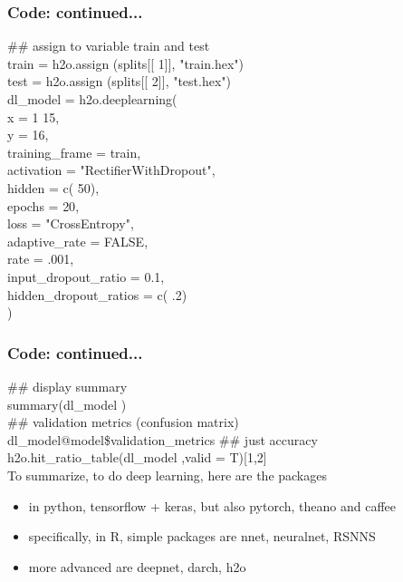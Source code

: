 \documentclass{beamer}
\begin{document}
\begin{frame}
\frametitle{Code: continued...}
{\color{applegreen}  \#\# assign to variable train and test } \\
train = h2o.assign (splits[[ {\color{blue} 1}]], {\color{red}"train.hex"}) \\
test  = h2o.assign (splits[[{\color{blue}  2}]], {\color{red}"test.hex"})     \\
dl\_model = h2o.deeplearning(  \\
\hspace{0.5cm}    x = {\color{blue} 1} {\color{blue} 15},  \\
\hspace{0.5cm}    y = {\color{blue} 16},  \\
\hspace{0.5cm}    training\_frame = train,  \\
\hspace{0.5cm}    activation = {\color{red}"RectifierWithDropout"}, \\
\hspace{0.5cm}    hidden = c({\color{blue} 50}), \\
\hspace{0.5cm}    epochs = {\color{blue} 20}, \\
\hspace{0.5cm}    loss = {\color{red}"CrossEntropy"}, \\
\hspace{0.5cm}    adaptive\_rate = FALSE, \\
\hspace{0.5cm}    rate ={\color{blue} .001}, \\
\hspace{0.5cm}    input\_dropout\_ratio = {\color{blue} 0.1}, \\
\hspace{0.5cm}    hidden\_dropout\_ratios = c({\color{blue} .2}) \\
)
\end{frame}

\begin{frame}
\frametitle{Code: continued...}
{\color{applegreen}  \#\# display summary } \\
summary(dl\_model ) \\
{\color{applegreen}  \#\# validation metrics (confusion matrix)} \\
dl\_model@model\$validation\_metrics     
{\color{applegreen}  \#\# just accuracy } \\
h2o.hit\_ratio\_table(dl\_model ,valid = T)[1,2] \\
\vspace{1cm}
To summarize, to do deep learning, here are the packages
\begin{itemize}
\item in python, tensorflow + keras, but also pytorch, theano and caffee
\item specifically, in R, simple packages are nnet, neuralnet, RSNNS
\item more advanced are deepnet, darch, h2o
\end{itemize}
\end{frame}
\end{document}
